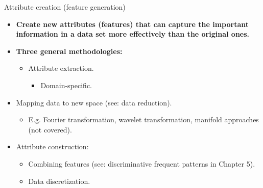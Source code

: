 \documentclass[aspectratio=169,t]{beamer}
\begin{document}
  { 
    \begin{frame}{Attribute creation (feature generation)}
    \begin{itemize}
      \item \textbf{Create new attributes (features) that can capture the important information in a data set more effectively than the original ones.}
      \item \textbf{Three general methodologies:}
      \begin{itemize}
        \item Attribute extraction.
        \begin{itemize}
          \item Domain-specific.
        \end{itemize}
      \end{itemize}
      \item Mapping data to new space (see: data reduction).
      \begin{itemize}
        \item E.g. Fourier transformation, wavelet transformation, manifold approaches (not covered).
      \end{itemize}
      \item Attribute construction:
      \begin{itemize}
        \item Combining features (see: discriminative frequent patterns in Chapter 5).
        \item Data discretization.
      \end{itemize}
    \end{itemize}
    \end{frame}
  }
\end{document}
